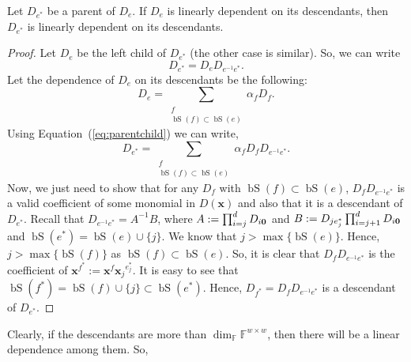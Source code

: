 \documentclass[final,oneeqnum, onethmnum, onefignum]{siamltex1213}
\newcommand{\F}{\mathbb F}
\newcommand{\Dx}{D(\mathbf{x})}
\DeclareMathOperator{\bS}{bS}
\begin{document}
\begin{lemma}
Let $D_{e^*}$ be a parent of $D_{e}$. 
If $D_{e}$ is linearly dependent on its descendants,
then $D_{e^*}$ is linearly dependent on its descendants. 
\label{lem:parentchild}
\end{lemma} 
\begin{proof}
Let $D_{e}$ be the left child of $D_{e^*}$ 
(the other case is similar).
So, we can write 
\begin{equation}
D_{e^*} =  D_{e} D_{e^{-1}e^*}.
\label{eq:parentchild}
\end{equation}
Let the dependence of $D_e$ on its descendants be the following: 
$$
D_{e} = \sum_{\substack{f \\ \bS(f) \subset \bS(e)}} \alpha_f D_{f}.
$$
Using Equation~(\ref{eq:parentchild}) we can write,
$$
D_{e^*} = \sum_{\substack{f \\ \bS(f) \subset \bS(e)}} \alpha_f D_{f} D_{e^{-1}e^*}.
$$
Now, we just need to show that
for any $D_f$ with $\bS(f) \subset \bS(e)$,
 $D_{f} D_{e^{-1}e^*}$ 
is a valid coefficient of some monomial in $\Dx$ and 
also that it is a descendant of $D_{e^*}$.
Recall that $D_{e^{-1}e^*} = A^{-1}B$, 
where $A := \prod_{i=j}^{d} D_{i{\bf 0}}$
and $B := D_{j e^*_{j}}\prod_{i=j+1}^{d} D_{i{\bf 0}}$
and $\bS(e^*) = \bS(e) \cup \{j\}$.
We know that $j > \max\{\bS(e)\}$. 
Hence, $j > \max\{\bS(f)\}$ as $\bS(f) \subset \bS(e)$.
So, it is clear that $D_{f} D_{e^{-1}e^*}$
is the coefficient of ${\mathbf{x}}^{f^*} := {\mathbf{x}}^f {\mathbf{x}_{j}}^{e^*_{j}}$.
It is easy to see that $\bS(f^*) = \bS(f) \cup \{j\} \subset \bS(e^*)$.
Hence, $D_{f^*}=D_{f} D_{e^{-1}e^*} $ is a descendant of $D_{e^*}$.

\end{proof}

Clearly, if the descendants are more than $\dim_{\F}\F^{w \times w}$,
then there will be a linear dependence among them. So, 
\end{document}
